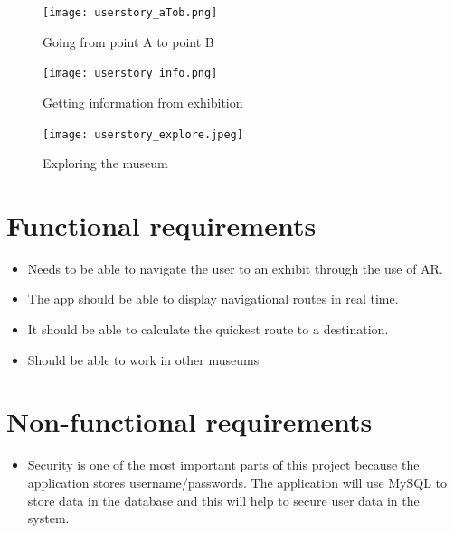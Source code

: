 \begin{figure}[H]
    \centering
    \texttt{[image: userstory\_aTob.png]}
    \caption{Going from point A to point B}
    \label{fig:AtoB}
\end{figure}

\begin{figure}[H]
    \texttt{[image: userstory\_info.png]}
    \caption{Getting information from exhibition}
    \label{fig:infofromexhibit}
\end{figure}

\begin{figure}[H]
    \texttt{[image: userstory\_explore.jpeg]}
    \caption{Exploring the museum}
    \label{fig:exploring}
\end{figure}

\section{Functional requirements}
\begin{itemize}
        \item Needs to be able to navigate the user to an exhibit through the use of AR.
        \item The app should be able to display navigational routes in real time.
        \item It should be able to calculate the quickest route to a destination.
        \item Should be able to work in other museums
\end{itemize}

\section{Non-functional requirements}
\begin{itemize}
        \item Security is one of the most important parts of this project because the application stores username/passwords. The application will use MySQL to store data in the database and this will help to secure user data in the system.
\end{itemize}
    